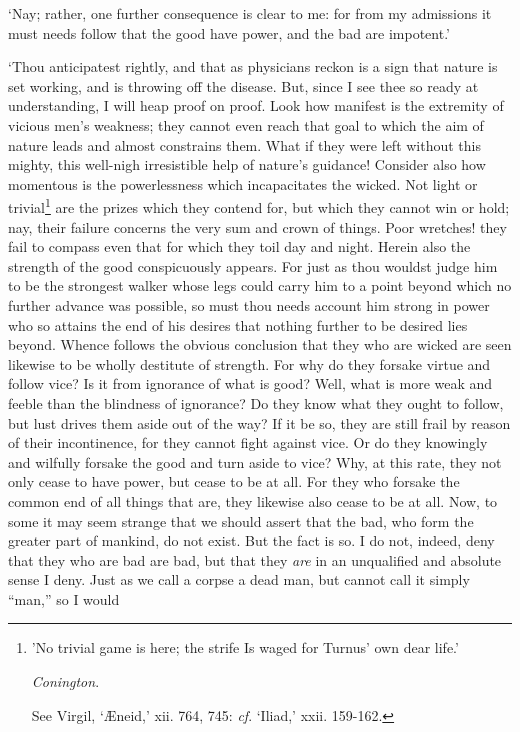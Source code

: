 \documentclass[11pt]{book}
\begin{document}
`Nay; rather, one further consequence is clear to me: for from my
admissions it must needs follow that the good have power, and the bad
are impotent.'

`Thou anticipatest rightly, and that as physicians \linebreak reckon is a sign that
nature is set working, and is throwing off the disease. But, since I see
thee so ready at understanding, I will heap proof on proof. Look how
manifest is the extremity of vicious men's weakness; they cannot even
reach that goal to which the aim of nature leads and almost constrains
them. What if they were left without this mighty, this well-nigh
irresistible help of nature's guidance! Consider also how momentous is
the powerlessness which incapacitates the wicked. Not light or
trivial\footnote{'No trivial game is here; the strife Is waged for Turnus' own dear life.'

\emph{Conington}.

See Virgil, `Æneid,' xii. 764, 745: \emph{cf}. `Iliad,' xxii. 159-162.}
are the prizes which they contend for, but which they cannot
win or hold; nay, their failure concerns the very sum and crown of
things. Poor wretches! they fail to compass even that for which they
toil day and night. Herein also the strength of the good conspicuously
appears. For just as thou wouldst judge him to be the strongest walker
whose legs could carry him to a point beyond which no further advance
was possible, so must thou needs account him strong in power who so
attains the end of his desires that nothing further to be desired lies
beyond. Whence follows the obvious conclusion that they who are wicked
are seen likewise to be wholly destitute of strength. For why do they
forsake virtue and follow vice? Is it from ignorance of what is good?
Well, what is more weak and feeble than the blindness of ignorance? Do
they know what they ought to follow, but lust drives them aside out of
the way? If it be so, they are still frail by reason of their
incontinence, for they cannot fight against vice. Or do they knowingly
and wilfully forsake the good and turn aside to vice? Why, at this rate,
they not only cease to have power, but cease to be at all. For they who
forsake the common end of all things that are, they likewise also cease
to be at all. Now, to some it may seem strange that we should assert
that the bad, who form the greater part of mankind, do not exist. But
the fact is so. I do not, indeed, deny that they who are bad are bad,
but that they \emph{are} in an unqualified and absolute sense I deny. Just as
we call a corpse a dead man, but cannot call it simply ``man,'' so I would
\end{document}
